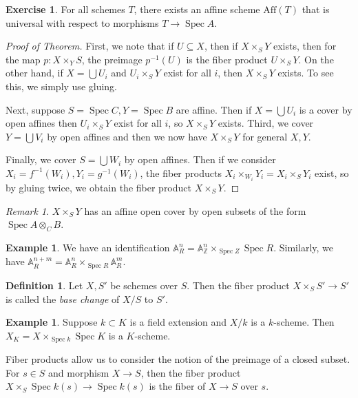 \documentclass[leqno, openany]{memoir}
\theoremstyle{definition}
\newtheorem{defn}[thm]{Definition}
\newtheorem{exm}[thm]{Example}
\newtheorem{exer}[thm]{Exercise}
\theoremstyle{remark}
\newtheorem{rmk}[thm]{Remark}
\theoremstyle{plain}
\theoremstyle{definition}
\theoremstyle{remark}
\newcommand{\A}{\mathbb{A}}
\newcommand{\Z}{\mathbb{Z}}
\newcommand{\mr}[1]{\mathrm{#1}}
\DeclareMathOperator{\Spec}{Spec}
\begin{document}
\begin{exer} For all schemes $T$, there exists an affine scheme $\mr{Aff}(T)$
that is universal with respect to morphisms $T \to \Spec A$.  \end{exer}


\begin{proof}[Proof of Theorem] First, we note that if $U \subseteq X$, then if
    $X \times_S Y$ exists, then for the map $p \colon X \times_Y S$, the
    preimage $p^{-1}(U)$ is the fiber product $U \times_S Y$. On the other
    hand, if $X = \bigcup U_i$ and $U_i \times_S Y$ exist for all $i$, then $X
    \times_S Y$ exists. To see this, we simply use gluing. 

    Next, suppose $S = \Spec C, Y = \Spec B$ are affine. Then if $X = \bigcup
    U_i$ is a cover by open affines then $U_i \times_S Y$ exist for all $i$, so
    $X \times_S Y$ exists. Third, we cover $Y = \bigcup V_i$ by open affines
    and then we now have $X \times_S Y$ for general $X,Y$.

    Finally, we cover $S = \bigcup W_i$ by open affines. Then if we consider
$X_i = f^{-1}(W_i), Y_i = g^{-1}(W_i)$, the fiber products $X_i \times_{W_i}
Y_i = X_i \times_S Y_i$ exist, so by gluing twice, we obtain the fiber product
$X \times_S Y$.  \end{proof}

\begin{rmk} $X \times_S Y$ has an affine open cover by open subsets of the form
$\Spec A \otimes_C B$.  \end{rmk}

\begin{exm} We have an identification $\A_R^n = \A_{\Z}^n \times_{\Spec Z}
\Spec R$. Similarly, we have $\A_R^{n+m} = \A_R^n \times_{\Spec R} \A_R^m$.
\end{exm}

\begin{defn} Let $X, S'$ be schemes over $S$. Then the fiber product $X
\times_S S' \to S'$ is called the \textit{base change} of $X/S$ to $S'$.
\end{defn}

\begin{exm} Suppose $k \subset K$ is a field extension and $X/k$ is a
$k$-scheme. Then $X_K = X \times_{\Spec k} \Spec K$ is a $K$-scheme.  \end{exm}

Fiber products allow us to consider the notion of the preimage of a closed
subset. For $s \in S$ and morphism $X \to S$, then the fiber product $X
\times_S \Spec k(s) \to \Spec k(s)$ is the fiber of $X \to S$ over $s$.
\end{document}

